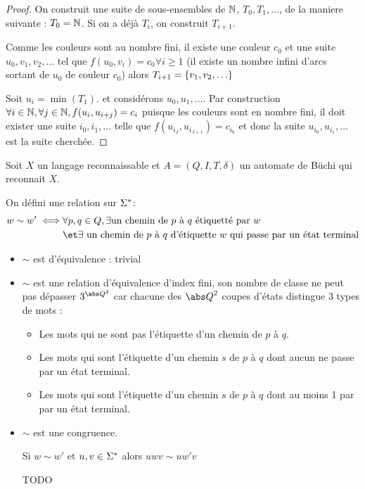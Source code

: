 \begin{proof}
	On construit une suite de sous-ensembles de $\mathbb{N}$, $T_0, T_1, \ldots$, de la maniere suivante :
	$T_0 = \mathbb{N}$. Si on a déjà $T_i$, on construit $T_{i+1}$.

	Comme les couleurs sont au nombre fini, il existe une couleur $c_0$ et une suite
	$u_0, v_1, v_2, \ldots$ tel que $f(u_0, v_i) = c_0 \forall i \geq 1$ (il existe un nombre infini d'arcs sortant de $u_0$ de couleur $c_0$)
	alors $T_{i+1} = \left\{v_1, v_2, \ldots\right\}$


	Soit $u_i = \min (T_1)$. et considérons $u_0, u_1, \ldots$. Par construction $\forall i \in \mathbb{N}, \forall j \in \mathbb{N}, f(u_i, u_{i + j}) = c_i$
	puisque les couleurs sont en nombre fini, il doit exister une suite $i_0, i_1, \ldots$ telle que $f(u_{i_J}, u_{i_{J+1}}) = c_{i_0}$
	et donc la suite $u_{i_0},u_{i_1}, \ldots$ est la suite cherchée.
\end{proof}


Soit $X$ un langage reconnaissable et $A = (Q,I,T,\delta)$ un automate de Büchi qui reconnait $X$.


On défini une relation sur $\Sigma^{*}$:
\begin{eqnarray*}
	w \sim w' \iff &\forall p,q \in Q, \exists \text{un chemin de $p$ à $q$ étiquetté par } w \\
	&\et \exists \text{ un chemin de $p$ à $q$ d'étiquette $w$ qui passe par un état terminal}
\end{eqnarray*}


\begin{itemize}
	\item $\sim$ est d'équivalence : trivial
	\item $\sim$ est une relation d'équivalence d'index fini, son nombre de classe ne peut pas dépasser $3^{{\abs Q}^2}$
	      car chacune des ${\abs Q}^2$ coupes d'états distingue 3 types de mots :
	      \begin{itemize}
		      \item Les mots qui ne sont pas l'étiquette d'un chemin de $p$ à $q$.
		      \item Les mots qui sont l'étiquette d'un chemin $s$ de $p$ à $q$ dont aucun ne passe par un état terminal.
		      \item Les mots qui sont l'étiquette d'un chemin $s$ de $p$ à $q$ dont au moins 1 par par un état terminal.
	      \end{itemize}
	\item $\sim$ est une congruence.

	      Si $w \sim w'$ et $u,v \in \Sigma^{*}$ alors $uwv \sim uw'v$

	      TODO
\end{itemize}

